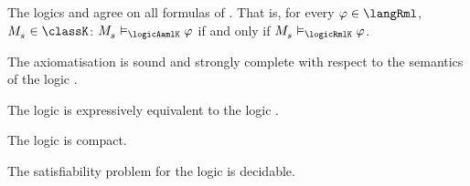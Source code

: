 \begin{corollary}
The logics \logicAamlKFF{} and \logicRmlKFF{} agree on all formulas of \langRml{}.
That is, for every $\phi \in \langRml$, $\kPModel{\kStateS} \in \classK$: $\kPModel{\kStateS} \entails_\logicAamlK \phi$ if and only if $\kPModel{\kStateS} \entails_\logicRmlK \phi$.
\end{corollary}

\begin{corollary}
The axiomatisation \axiomRamlKFF{} is sound and strongly complete with respect to the semantics of the logic \logicAamlKFF{}.
\end{corollary}

\begin{corollary}
The logic \logicAamlKFF{} is expressively equivalent to the logic \logicKFF{}.
\end{corollary}

\begin{corollary}
The logic \logicAamlKFF{} is compact.
\end{corollary}

\begin{corollary}
The satisfiability problem for the logic \logicAamlKFF{} is decidable.
\end{corollary}
